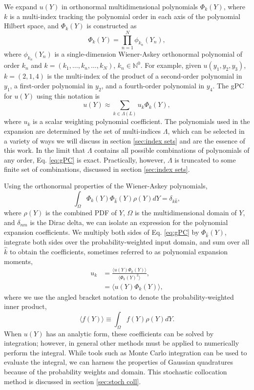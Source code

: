 We expand $u(Y)$ in orthonormal multidimensional polynomials $\Phi_k(Y)$, where $k$ is a multi-index tracking
the polynomial order in each axis of the polynomial Hilbert space, and $\Phi_k(Y)$ is constructed as
\begin{equation}\label{eq:gPC}
  \Phi_k(Y) = \prod_{n=1}^N \phi_{k_n}(Y_n),
\end{equation}
where $\phi_{k_n}(Y_n)$ is a single-dimension Wiener-Askey orthonormal polynomial of order $k_n$ and
$k=(k_1,\ldots,k_n,\ldots,k_N)$, $k_n\in\mathbb{N}^0$.  For example, given $u(y_1,y_2,y_3)$, $k=(2,1,4)$
is the multi-index of the
product of a second-order polynomial in $y_1$, a first-order polynomial in $y_2$, and a fourth-order
polynomial in $y_4$. The gPC for $u(Y)$ using this notation is
\begin{equation}
  u(Y) \approx \sum_{k\in\Lambda(L)} u_k\Phi_k(Y),
\end{equation}
where $u_k$ is a scalar weighting polynomial coefficient. The polynomials used in the expansion are determined
by the set of multi-indices $\Lambda$, which can be selected in a variety of ways we will discuss in section
\ref{sec:index sets} and are the essence of this work.  In the limit
that $\Lambda$ contains all possible combinations of polynomials of any order, Eq. \ref{eq:gPC} is exact.
Practically, however, $\Lambda$ is truncated to some finite set of combinations, discussed in section
\ref{sec:index sets}.

Using the orthonormal properties of the Wiener-Askey polynomials,
\begin{equation}
  \int_\Omega \Phi_k(Y)\Phi_{\hat k}(Y) \rho(Y) dY = \delta_{k\hat k},
\end{equation}
where $\rho(Y)$ is the combined PDF of $Y$, $\Omega$ is the multidimensional domain of $Y$, and $\delta_{nm}$
is the Dirac delta, we can isolate an expression for the polynomial expansion coefficients.
We multiply both sides of Eq. \ref{eq:gPC} by
$\Phi_{\hat k}(Y)$, integrate both sides over the probability-weighted input domain, and sum over all $\hat k$
to obtain the coefficients, sometimes referred to as polynomial expansion moments,
\begin{align}\label{eq:polycoeff}
  u_k &= \frac{\langle u(Y)\Phi_k(Y) \rangle}{\langle \Phi_k(Y)^2 \rangle},\\
      &= \langle u(Y)\Phi_k(Y) \rangle,
\end{align}
where we use the angled bracket notation to denote the probability-weighted inner product,
\begin{equation}
  \langle f(Y) \rangle \equiv \int_\Omega f(Y)\rho(Y) dY.
\end{equation}
When $u(Y)$ has an analytic form, these coefficients can be solved by integration; however, in general other
methods must be applied to numerically perform the integral.  While tools such as Monte Carlo integration can
be used to evaluate the integral, we can harness the properties of Gaussian quadratures because of the
probability weights and domain.  This stochastic collocation method is discussed in section \ref{sec:stoch
coll}.

